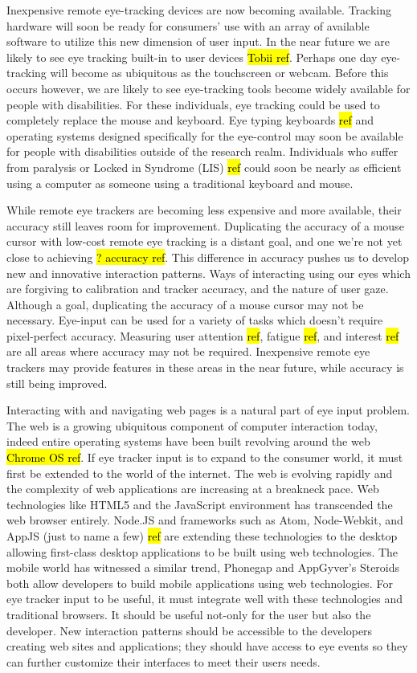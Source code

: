 \documentclass{sigchi}
\begin{document}
Inexpensive remote eye-tracking devices are now becoming available. Tracking hardware will soon be ready for consumers' use with an array of available software to utilize this new dimension of user input. In the near future we are likely to see eye tracking built-in to user devices \hl{Tobii ref}. Perhaps one day eye-tracking will become as ubiquitous as the touchscreen or webcam. Before this occurs however, we are likely to see eye-tracking tools become widely available for people with disabilities. For these individuals, eye tracking could be used to completely replace the mouse and keyboard. Eye typing keyboards \hl{ref} and operating systems designed specifically for the eye-control may soon be available for people with disabilities outside of the research realm. Individuals who suffer from paralysis or Locked in Syndrome (LIS) \hl{ref} could soon be nearly as efficient using a computer as someone using a traditional keyboard and mouse.

While remote eye trackers are becoming less expensive and more available, their accuracy still leaves room for improvement. Duplicating the accuracy of a mouse cursor with low-cost remote eye tracking is a distant goal, and one we're not yet close to achieving \hl{? accuracy ref}. This difference in accuracy pushes us to develop new and innovative interaction patterns. Ways of interacting using our eyes which are forgiving to calibration and tracker accuracy, and the nature of user gaze. Although a goal, duplicating the accuracy of a mouse cursor may not be necessary. Eye-input can be used for a variety of tasks which doesn't require pixel-perfect accuracy. Measuring user attention \hl{ref}, fatigue \hl{ref}, and interest \hl{ref} are all areas where accuracy may not be required. Inexpensive remote eye trackers may provide features in these areas in the near future, while accuracy is still being improved.

Interacting with and navigating web pages is a natural part of eye input problem. The web is a growing ubiquitous component of computer interaction today, indeed entire operating systems have been built revolving around the web \hl{Chrome OS ref}. If eye tracker input is to expand to the consumer world, it must first be extended to the world of the internet. The web is evolving rapidly and the complexity of web applications are increasing at a breakneck pace. Web technologies like HTML5 and the JavaScript environment has transcended the web browser entirely. Node.JS and frameworks such as Atom, Node-Webkit, and AppJS (just to name a few) \hl{ref} are extending these technologies to the desktop allowing first-class desktop applications to be built using web technologies. The mobile world has witnessed a similar trend, Phonegap and AppGyver's Steroids both allow developers to build mobile applications using web technologies. For eye tracker input to be useful, it must integrate well with these technologies and traditional browsers. It should be useful not-only for the user but also the developer. New interaction patterns should be accessible to the developers creating web sites and applications; they should have access to eye events so they can further customize their interfaces to meet their users needs.
\end{document}
